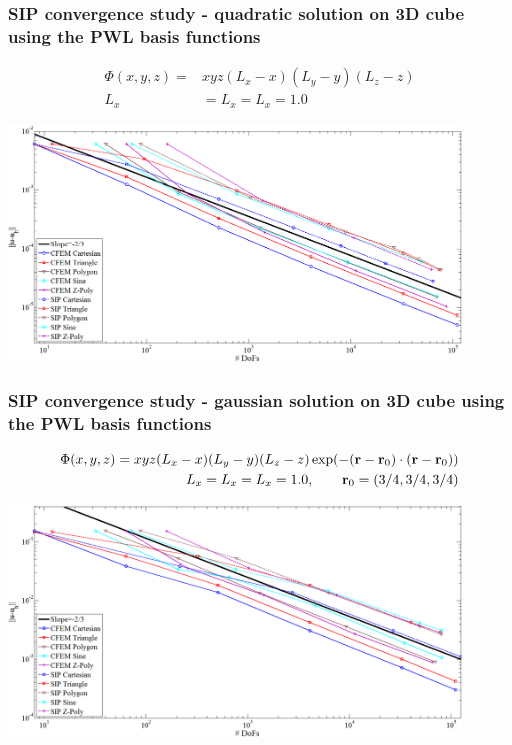 \documentclass[compress,10pt]{beamer}
\begin{document}
\begin{frame}[t]\frametitle{SIP convergence study - quadratic solution on 3D cube using the PWL basis functions}
\begin{block}{}
	\begin{equation*}
		\begin{aligned}
		\Phi(x,y,z) =& x y z (L_x - x)  (L_y - y)  (L_z - z) \\
		L_x& = L_x = L_x = 1.0
		\end{aligned}
	\end{equation*}
\end{block}
\centering
\includegraphics[width=0.9\textwidth]{images/sip_quad_full_paint.png} 
\end{frame}
\begin{frame}[t]\frametitle{SIP convergence study - gaussian solution on 3D cube using the PWL basis functions}
\begin{block}{}
	\begin{equation*}
		\begin{aligned}
		\Phi(x,y,z) = x y z (L_x - x)  (L_y - y)  (L_z - z) \exp(-({\bf r} - {\bf r}_0) \cdot ({\bf r} - {\bf r}_0))\\
		L_x = L_x = L_x = 1.0 , \qquad {\bf r}_0 = (3/4,3/4,3/4)
		\end{aligned}
	\end{equation*}
\end{block}
\centering
\includegraphics[width=0.9\textwidth]{images/sip_gauss_full_paint.png} 
\end{frame}
\end{document}
